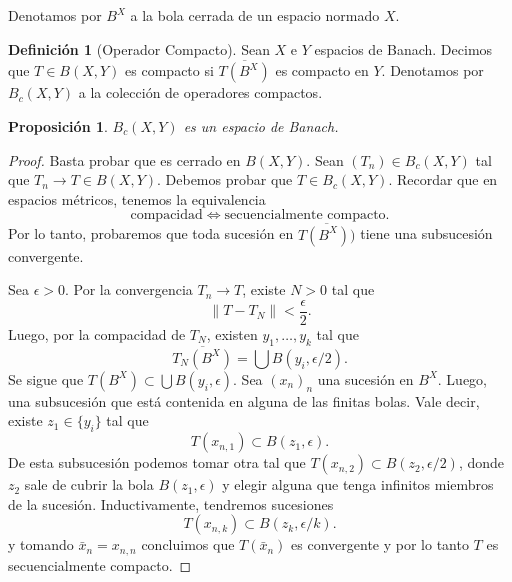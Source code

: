 \documentclass{article}
\newtheorem{Proposicion}{Proposición}
\theoremstyle{plain}
\theoremstyle{definition}
\newtheorem{Definicion}{Definición}
\newcommand{\1}[1]{\mathbbm{1}\left( #1 \right)}
\newcommand{\norm}[1]{\lVert #1 \rVert}
\begin{document}
\noindent{}
\newline


Denotamos por \(B^X\) a la bola cerrada de un espacio normado \(X\).  

\begin{Definicion}[Operador Compacto]
  Sean \(X\) e \(Y\) espacios de Banach. Decimos que \(T\in B(X,Y)\) es compacto
  si \(\overline{T(B^X)}\) es compacto en \(Y\). Denotamos por 
  \(B_c(X,Y)\) a la colección de operadores compactos. 
\end{Definicion}

\begin{Proposicion}
  \(B_c(X,Y)\) es un espacio de Banach.
\end{Proposicion}
\begin{proof}
  Basta probar que es cerrado en \(B(X,Y)\). Sean \((T_n)\in B_c(X,Y)\) tal
  que \(T_n \to T \in B(X,Y)\). Debemos probar que \(T\in B_c(X,Y)\).
  Recordar que en espacios métricos, tenemos la equivalencia
  \begin{displaymath}
    \text{compacidad} \iff \text{secuencialmente compacto}.
  \end{displaymath}
  Por lo tanto, probaremos que toda sucesión en \(\overline{T(B^X))}\)
  tiene una subsucesión convergente.

  Sea \(\epsilon > 0\). 
  Por la convergencia \(T_n \to T\), existe \(N>0\) tal que
  \begin{displaymath}
    \norm{T - T_N} < \frac{\epsilon}{2}.
  \end{displaymath}
  Luego, por la compacidad de \(T_N\), existen \(y_1, \ldots, y_k\) tal que
  \begin{displaymath}
    \overline{T_N(B^X)} = \bigcup B(y_i, \epsilon/2). 
  \end{displaymath}
  Se sigue que \(T(B^X) \subset \bigcup B(y_i, \epsilon)\). 
  Sea \((x_n)_n\) una sucesión en \(B^X\). Luego, una subsucesión
  que está contenida en alguna de las finitas bolas. Vale decir,
  existe \(z_1 \in \lbrace y_i \rbrace\) tal que 
  \begin{displaymath}
    T(x_{n,1}) \subset B(z_1, \epsilon).
  \end{displaymath}
  De esta subsucesión podemos tomar otra tal que \(T(x_{n,2}) \subset B(z_2, \epsilon/2)\), donde
  \(z_2\) sale de cubrir la bola \(B(z_1,\epsilon)\) y elegir alguna que tenga infinitos miembros
  de la sucesión. Inductivamente, tendremos sucesiones
  \begin{displaymath}
    T(x_{n,k}) \subset B(z_k, \epsilon/k).
  \end{displaymath}
  y tomando \(\bar x_n = x_{n,n}\) concluimos que \(T(\bar x_n)\) es convergente y por lo tanto
  \(T\) es secuencialmente compacto.
\end{proof}
\end{document}
